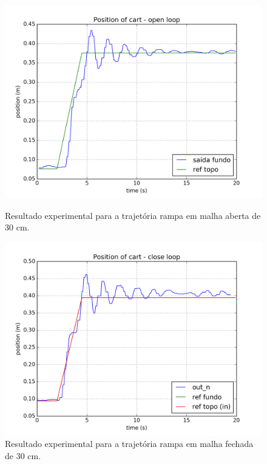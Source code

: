 \begin{figure}[!ht]
\centering
\begin{minipage}{0.45\textwidth}
\centering
\includegraphics[width=1\linewidth]{figs/resultados/experimento/open_loop_ramp}
\caption{Resultado experimental para a trajetória rampa em malha aberta de 30 cm. \label{malhaAbertaRampa}}
\end{minipage}
\hspace{0.1cm}
\begin{minipage}{0.45\textwidth}
\centering
\includegraphics[width=1\linewidth]{figs/resultados/experimento/closed_loop_trajetoria_rampa}
\caption{Resultado experimental para a trajetória rampa em malha fechada de 30 cm. \label{malhaFechadaRampa}}
\end{minipage}
\end{figure}

